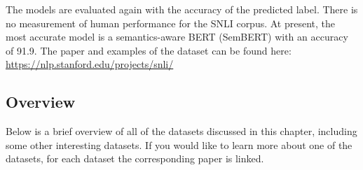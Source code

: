 \documentclass[]{krantz}
\begin{document}
The models are evaluated again with the accuracy of the predicted label. There is no measurement of human performance for the SNLI corpus. At present, the most accurate model is a semantics-aware BERT (SemBERT) with an accuracy of 91.9.
The paper and examples of the dataset can be found here:
\center \url{https://nlp.stanford.edu/projects/snli/}

\flushleft

\hypertarget{overview}{%
\subsection{Overview}\label{overview}}

Below is a brief overview of all of the datasets discussed in this chapter, including some other interesting datasets. If you would like to learn more about one of the datasets, for each dataset the corresponding paper is linked.
\end{document}
